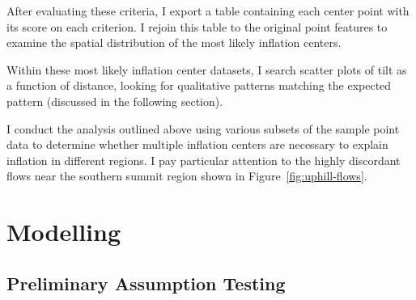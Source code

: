 After evaluating these criteria, I export a table containing each center point with its score on each criterion. I rejoin this table to the original point features to examine the spatial distribution of the most likely inflation centers.

Within these most likely inflation center datasets, I search scatter plots of tilt as a function of distance, looking for qualitative patterns matching the expected pattern (discussed in the following section).

I conduct the analysis outlined above using various subsets of the sample point data to determine whether multiple inflation centers are necessary to explain inflation in different regions. I pay particular attention to the highly discordant flows near the southern summit region shown in Figure~\ref{fig:uphill-flows}.

\section{Modelling}\label{sec:modelling}

\subsection{Preliminary Assumption Testing}


